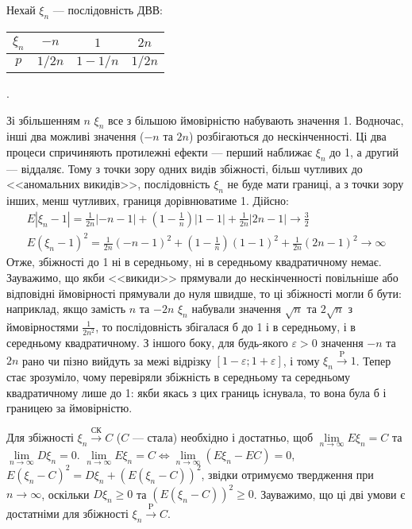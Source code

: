 \begin{example}
    Нехай $\xi_n$ --- послідовність ДВВ: 
        \begin{tabular}{|c|c|c|c|}
            \hline
            $\xi_n$ & $-n$ & $1$ & $2n$ \\
            \hline
            $p$ & $1/{2n}$ & $1 - 1/n$ & $1/{2n}$ \\
            \hline
        \end{tabular}.

    Зі збільшенням $n$ $\xi_n$ все з більшою ймовірністю набувають значення 1. 
    Водночас, інші два можливі значення ($-n$ та $2n$) розбігаються до нескінченності. 
    Ці два процеси спричиняють протилежні ефекти --- перший наближає $\xi_n$ до 1, а другий --- віддаляє. 
    Тому з точки зору одних видів збіжності, більш чутливих до <<аномальних викидів>>, послідовність $\xi_n$ не буде мати границі, 
    а з точки зору інших, менш чутливих, границя дорівнюватиме 1.
    Дійсно: 
    \begin{gather*}
        E\left|\xi_n -1 \right| = \frac{1}{2n} |-n-1|  + \left( 1 - \frac{1}{n}\right)|1-1| + \frac{1}{2n}|2n-1| \to \frac{3}{2} \\
        E\left(\xi_n -1 \right)^2 = \frac{1}{2n} (-n-1)^2  + \left( 1 - \frac{1}{n}\right)(1-1)^2 + \frac{1}{2n}(2n-1)^2 \to \infty
    \end{gather*}
    Отже, збіжності до 1 ні в середньому, ні в середньому квадратичному немає. Зауважимо, що якби <<викиди>> прямували до нескінченності повільніше або відповідні
    ймовірності прямували до нуля швидше, то ці збіжності могли б бути: наприклад, якщо замість $n$ та $-2n$ $\xi_n$ набували значення $\sqrt{n}$ та $2\sqrt{n}$
    з ймовірностями $\frac{1}{2n^2}$, то послідовність збігалася б до 1 і в середньому, і в середньому квадратичному.
    З іншого боку, для будь-якого $\varepsilon>0$ значення $-n$ та $2n$ рано чи пізно вийдуть за межі відрізку $[1-\varepsilon;1+\varepsilon]$, і тому
    $\xi_n \overset{\mathrm{P}}{\longrightarrow} 1$. Тепер стає зрозуміло, чому перевіряли збіжність в середньому та середньому квадратичному лише до 1: якби
    якась з цих границь існувала, то вона була б і границею за ймовірністю.
\end{example}
\begin{remark}Для збіжності $\xi_n \overset{\text{СК}}{\longrightarrow} C$ ($C$ --- стала) необхідно і достатньо, щоб
$\underset{n \to \infty}{\lim} E\xi_n = C$ та $\underset{n \to \infty}{\lim} D\xi_n = 0$.
$\underset{n \to \infty}{\lim} E\xi_n = C \Leftrightarrow \underset{n \to \infty}{\lim} (E\xi_n - EC) = 0$,
$E(\xi_n - C)^2 = D\xi_n + (E(\xi_n -C))^2$,
звідки отримуємо твердження при $n \to \infty$, оскільки $D\xi_n \geq 0$ та $(E(\xi_n -C))^2 \geq 0$.
Зауважимо, що ці дві умови є достатніми для збіжності $\xi_n \overset{\mathrm{P}}{\longrightarrow} C$.
\end{remark}
